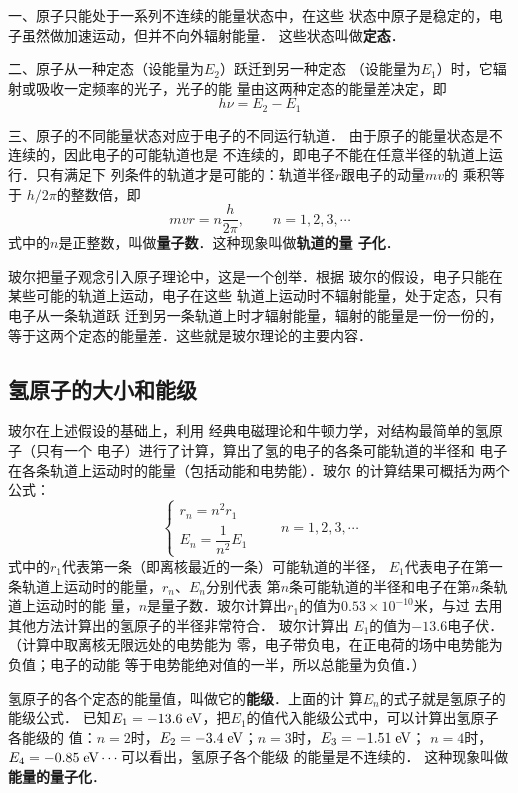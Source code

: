 一、原子只能处于一系列不连续的能量状态中，在这些
状态中原子是稳定的，电子虽然做加速运动，但并不向外辐射能量．
这些状态叫做\textbf{定态}．

二、原子从一种定态（设能量为$E_2$）跃迁到另一种定态
（设能量为$E_1$）时，它辐射或吸收一定频率的光子，光子的能
量由这两种定态的能量差决定，即
\[h\nu=E_2-E_1\]

三、原子的不同能量状态对应于电子的不同运行轨道．
由于原子的能量状态是不连续的，因此电子的可能轨道也是
不连续的，即电子不能在任意半径的轨道上运行．只有满足下
列条件的轨道才是可能的：轨道半径$r$跟电子的动量$mv$的
乘积等于 $h/2\pi$的整数倍，即
\[mvr=n\frac{h}{2\pi},\qquad n=1,2,3,\cdots\]
式中的$n$是正整数，叫做\textbf{量子数}．这种现象叫做\textbf{轨道的量
子化}．

玻尔把量子观念引入原子理论中，这是一个创举．根据
玻尔的假设，电子只能在某些可能的轨道上运动，电子在这些
轨道上运动时不辐射能量，处于定态，只有电子从一条轨道跃
迁到另一条轨道上时才辐射能量，辐射的能量是一份一份的，
等于这两个定态的能量差．这些就是玻尔理论的主要内容．

\subsection{氢原子的大小和能级}

玻尔在上述假设的基础上，利用
经典电磁理论和牛顿力学，对结构最简单的氢原子（只有一个
电子）进行了计算，算出了氢的电子的各条可能轨道的半径和
电子在各条轨道上运动时的能量（包括动能和电势能）．玻尔
的计算结果可概括为两个公式：
\[\begin{cases}
    r_n=n^2 r_1\\
    E_n=\dfrac{1}{n^2}E_1
\end{cases}\qquad n=1,2,3,\cdots\]
式中的$r_1$代表第一条（即离核最近的一条）可能轨道的半径，
$E_1$代表电子在第一条轨道上运动时的能量，$r_n$、$E_n$分别代表
第$n$条可能轨道的半径和电子在第$n$条轨道上运动时的能
量，$n$是量子数．玻尔计算出$r_1$的值为$0.53\times10^{-10}$米，与过
去用其他方法计算出的氢原子的半径非常符合．
玻尔计算出
$E_1$的值为$-13.6$电子伏．（计算中取离核无限远处的电势能为
零，电子带负电，在正电荷的场中电势能为负值；电子的动能
等于电势能绝对值的一半，所以总能量为负值．）

氢原子的各个定态的能量值，叫做它的\textbf{能级}．上面的计
算$E_n$的式子就是氢原子的能级公式．
已知$E_1=-13.6 \;\text{eV} $，把$E_1$的值代入能级公式中，可以计算出氢原子各能级的
值：$n=2$时，$E_2=-3.4 \;\text{eV} $；$n=3$时，$E_3=-1.51 \;\text{eV} $；
$n=4$时，$E_4=-0.85\;\text{eV} \cdots$可以看出，氢原子各个能级
的能量是不连续的．
这种现象叫做\textbf{能量的量子化}．

